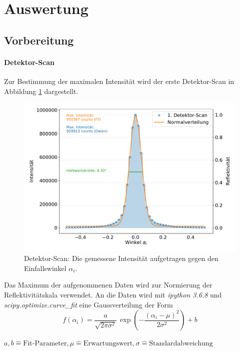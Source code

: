 \section{Auswertung}
\subsection{Vorbereitung}
\label{subsec:vorbereitung}
\paragraph{Detektor-Scan}
Zur Bestimmung der maximalen Intensität wird der erste Detektor-Scan in Abbildung \ref{fig:detek} dargestellt.
\begin{figure}[H]
  \centering
  \includegraphics[width=\textwidth]{content/images/done_plot_detektorscan.pdf}
  \caption{Detektor-Scan: Die gemessene Intensität aufgetragen gegen den Einfallswinkel $\alpha_i$.}
  \label{fig:detek}
\end{figure}
Das Maximum der aufgenommenen Daten wird zur Normierung der Reflektivitätskala verwendet.
An die Daten wird mit \textit{ipython 3.6.8} und \textit{scipy.optimize.curve\_fit} eine Gaussverteilung der Form
\begin{equation*}
	f(\alpha_i) = \frac{a}{\sqrt{2 \pi \sigma^2}} \, \exp{\left( - \frac{(\alpha_i-\mu)^2}{2 \sigma^2} \right)} + b
\end{equation*}
\begin{center}
	\tiny{$a, b  \widehat{=} \text{Fit-Parameter}, \mu \widehat{=} \text{Erwartungswert}, \sigma \widehat{=} \text{Standardabweichung} $}
\end{center}

